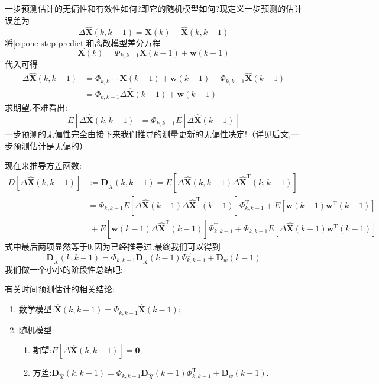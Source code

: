 \documentclass[cn,10pt,citestyle=gb7714-2015,bibstyle=gb7714-2015]{elegantbook}
\newcommand{\mT}{\mathrm{T}}
\begin{document}
一步预测估计的无偏性和有效性如何?即它的随机模型如何?现定义一步预测的\colorbox{yellow!20}{估计误差}为
\begin{equation}
  \Delta\hat{\bm{X}}(k,k-1)=\bm{X}(k)-\hat{\bm{X}}(k,k-1)
\end{equation}
将\eqref{eq:one-step-predict}和离散模型差分方程
\[
  \bm{X}(k)=\bm{\varPhi}_{k,k-1}\bm{X}(k-1)+\bm{w}(k-1)
\]代入可得
\begin{align*}
  \Delta\hat{\bm{X}}(k,k-1)&=\bm{\varPhi}_{k,k-1}\bm{X}(k-1)+\bm{w}(k-1)-\bm{\varPhi}_{k,k-1}\hat{\bm{X}}(k-1)\\
  &=\bm{\varPhi}_{k,k-1}\Delta\bm{\hat{X}}(k-1)+\bm{w}(k-1)
\end{align*}
求期望,不难看出:
\begin{equation}\label{eq:unbiased-or-not}
  E[\Delta\hat{\bm{X}}(k,k-1)]=\bm{\varPhi}_{k,k-1}E[\Delta\bm{\hat{X}}(k-1)]
\end{equation}
\textcolor{magenta}{\HandRight}一步预测的无偏性完全由接下来我们推导的测量更新的无偏性决定!（详见后文,一步预测估计是无偏的）

现在来推导方差函数:
\begin{align*}
  D[\Delta\hat{\bm{X}}(k,k-1)]&:=\bm{D}_{\hat{X}}(k,k-1)=E\left[\Delta\hat{\bm{X}}(k,k-1)\Delta\hat{\bm{X}}^\mT(k,k-1)\right]\\
  &=\bm{\varPhi}_{k,k-1}E\left[\Delta\bm{\hat{X}}(k-1)\Delta\bm{\hat{X}}^\mT(k-1)\right]\bm{\varPhi}^\mT_{k,k-1}+E\left[\bm{w}(k-1)\bm{w}^\mT(k-1)\right]\\
  &\ {}+E\left[\bm{w}(k-1)\Delta\bm{\hat{X}}^\mT(k-1)\right]\bm{\varPhi}^\mT_{k,k-1}+\bm{\varPhi}_{k,k-1}E\left[\Delta\bm{\hat{X}}(k-1)\bm{w}^\mT(k-1)\right]
\end{align*}
式中最后两项显然等于0,因为已经推导过.最终我们可以得到
\begin{equation}\label{eq:kalman-time-predict-variance}
  \bm{D}_{\hat{X}}(k,k-1)=\bm{\varPhi}_{k,k-1}\bm{D}_{\hat{X}}(k-1)\bm{\varPhi}^\mT_{k,k-1}+\bm{D}_{w}(k-1)
\end{equation}
我们做一个小小的阶段性总结吧:
\begin{conclusion}
  有关时间预测估计的相关结论:
  \begin{enumerate}
    \item 数学模型:$\displaystyle \hat{\bm{X}}(k,k-1)=\bm{\varPhi}_{k,k-1}\hat{\bm{X}}(k-1)$;
    \item 随机模型:
    \begin{enumerate}
      \item 期望:$\displaystyle E[\Delta\bm{\hat{X}}(k,k-1)]=\bm{0}$;
      \item 方差:$\displaystyle \bm{D}_{\hat{X}}(k,k-1)=\bm{\varPhi}_{k,k-1}\bm{D}_{\hat{X}}(k-1)\bm{\varPhi}^\mT_{k,k-1}+\bm{D}_w(k-1)$.
    \end{enumerate}
  \end{enumerate}
\end{conclusion}
\end{document}
